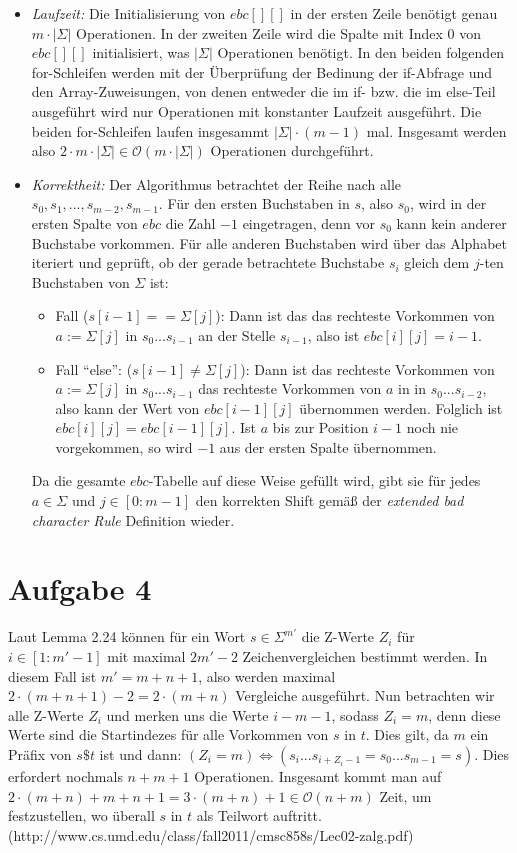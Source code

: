 \documentclass[a4paper,10pt,oneside,leqno]{scrartcl}
\begin{document}
\begin{itemize}
 \item \textit{Laufzeit:} Die Initialisierung von $ebc[][]$ in der ersten Zeile benötigt genau $m\cdot |\Sigma|$ Operationen. In der zweiten Zeile
 wird die Spalte mit Index 0 von $ebc[][]$ initialisiert, was $|\Sigma|$ Operationen benötigt. In den beiden folgenden for-Schleifen werden
 mit der Überprüfung der Bedinung der if-Abfrage und den Array-Zuweisungen, von denen entweder die im if- bzw. die im else-Teil ausgeführt
 wird nur Operationen mit konstanter Laufzeit ausgeführt. Die beiden for-Schleifen laufen insgesammt $|\Sigma| \cdot (m-1)$ mal. Insgesamt
 werden also $2\cdot m\cdot |\Sigma|\in \mathcal{O}(m\cdot |\Sigma|)$ Operationen durchgeführt.
 \item \textit{Korrektheit:} Der Algorithmus betrachtet der Reihe nach alle $s_0,s_1,...,s_{m-2},s_{m-1}$. Für den ersten Buchstaben in $s$,
 also $s_0$, wird in der ersten Spalte von $ebc$ die Zahl $-1$ eingetragen, denn vor $s_0$ kann kein anderer Buchstabe vorkommen.
 Für alle anderen Buchstaben wird über das Alphabet iteriert und geprüft, ob der gerade betrachtete Buchstabe $s_i$ gleich dem $j$-ten Buchstaben
 von $\Sigma$ ist:
  \begin{itemize}
   \item Fall ($s[i-1]==\Sigma[j]$): Dann ist das das rechteste Vorkommen von $a:=\Sigma[j]$ in $s_0...s_{i-1}$ an der Stelle $s_{i-1}$, also ist
   $ebc[i][j] = i-1$.
   \item Fall ``else'': ($s[i-1]\neq \Sigma[j]$): Dann ist das rechteste Vorkommen von $a:=\Sigma[j]$ in $s_0...s_{i-1}$ das rechteste Vorkommen
   von $a$ in in $s_0...s_{i-2}$, also kann der Wert von $ebc[i-1][j]$ übernommen werden. Folglich ist $ebc[i][j] = ebc[i-1][j]$. Ist $a$ bis zur
   Position $i-1$ noch nie vorgekommen, so wird $-1$ aus der ersten Spalte übernommen.
  \end{itemize}
  Da die gesamte $ebc$-Tabelle auf diese Weise gefüllt wird, gibt sie für jedes $a\in \Sigma$ und $j\in [0:m-1]$ den korrekten Shift gemäß der
  \textit{extended bad character Rule} Definition wieder.
\end{itemize}


\section*{Aufgabe 4}%
Laut Lemma 2.24 können für ein Wort $s\in \Sigma^{m'}$ die Z-Werte $Z_i$ für $i\in [1 : m'-1]$ mit
maximal $2m'-2$ Zeichenvergleichen bestimmt werden. In diesem Fall ist $m'=m+n+1$, also werden maximal $2\cdot(m+n+1)-2 = 2\cdot(m+n)$ Vergleiche
ausgeführt. Nun betrachten wir alle Z-Werte $Z_i$ und merken uns die Werte $i-m-1$, sodass $Z_i=m$, denn diese Werte sind die Startindezes für alle
Vorkommen von $s$ in $t$. Dies gilt, da $m$ ein Präfix von $s\$t$ ist und dann: $(Z_i = m) \Leftrightarrow (s_i...s_{i+Z_i-1} = s_0...s_{m-1} = s)$.
Dies erfordert nochmals $n+m+1$ Operationen. Insgesamt kommt man auf $2\cdot(m+n)+m+n+1 = 3\cdot(m+n)+1\in \mathcal{O}(n+m)$ Zeit, um festzustellen,
wo überall $s$ in $t$ als Teilwort auftritt. (http://www.cs.umd.edu/class/fall2011/cmsc858s/Lec02-zalg.pdf)
\end{document}
